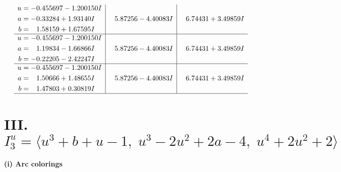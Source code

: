 \documentclass[1p]{elsarticle_modified}
\theoremstyle{definition}
\begin{document}
$$\begin{array}{c|c|c}
\begin{aligned}
u &= -0.455697 - 1.200150 I \\
a &= -0.33284 + 1.93140 I \\
b &= \phantom{-}1.58159 + 1.67595 I\end{aligned}
 & \phantom{-}5.87256 - 4.40083 I & \phantom{-}6.74431 + 3.49859 I \\ \hline\begin{aligned}
u &= -0.455697 - 1.200150 I \\
a &= \phantom{-}1.19834 - 1.66866 I \\
b &= -0.22205 - 2.42247 I\end{aligned}
 & \phantom{-}5.87256 - 4.40083 I & \phantom{-}6.74431 + 3.49859 I \\ \hline\begin{aligned}
u &= -0.455697 - 1.200150 I \\
a &= \phantom{-}1.50666 + 1.48655 I \\
b &= \phantom{-}1.47803 + 0.30819 I\end{aligned}
 & \phantom{-}5.87256 - 4.40083 I & \phantom{-}6.74431 + 3.49859 I\\
 \hline 
 \end{array}$$\newpage\newpage\renewcommand{\arraystretch}{1}
\centering \section*{III. $I^u_{3}= \langle u^3+b+u-1,\;u^3-2 u^2+2 a-4,\;u^4+2 u^2+2 \rangle$}
\flushleft \textbf{(i) Arc colorings}\\
\end{document}
